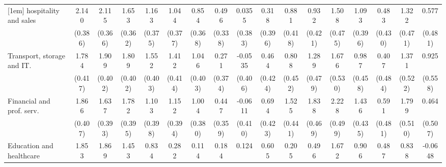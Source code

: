 {\begin{tabular}{l*{16}{c}}
[1em]
hospitality and sales&       2.140\sym{***}&       2.115\sym{***}&       1.653\sym{***}&       1.163\sym{**} &       1.044\sym{**} &       0.854\sym{*}  &       0.496         &      0.0355         &       0.318         &       0.881\sym{*}  &       0.932\sym{*}  &       1.508\sym{**} &       1.093\sym{**} &       0.483         &       1.322\sym{**} &       0.577         \\
                    &     (0.386)         &     (0.366)         &     (0.362)         &     (0.375)         &     (0.377)         &     (0.368)         &     (0.338)         &     (0.383)         &     (0.396)         &     (0.418)         &     (0.421)         &     (0.475)         &     (0.396)         &     (0.430)         &     (0.471)         &     (0.481)         \\
[1em]
Transport, storage and IT.&       1.784\sym{***}&       1.909\sym{***}&       1.809\sym{***}&       1.552\sym{***}&       1.412\sym{***}&       1.046\sym{**} &       0.271         &     -0.0535         &       0.464         &       0.808         &       1.289\sym{**} &       1.676\sym{**} &       0.987\sym{*}  &       0.407         &       1.371\sym{**} &       0.925         \\
                    &     (0.417)         &     (0.402)         &     (0.402)         &     (0.403)         &     (0.414)         &     (0.403)         &     (0.374)         &     (0.406)         &     (0.424)         &     (0.452)         &     (0.479)         &     (0.530)         &     (0.458)         &     (0.484)         &     (0.522)         &     (0.558)         \\
[1em]
Financial and prof. serv.&       1.866\sym{***}&       1.637\sym{***}&       1.782\sym{***}&       1.103\sym{**} &       1.152\sym{**} &       1.004\sym{**} &       0.447         &     -0.0611         &       0.694         &       1.525\sym{***}&       1.838\sym{***}&       2.228\sym{***}&       1.436\sym{***}&       0.591         &       1.799\sym{***}&       0.464         \\
                    &     (0.407)         &     (0.393)         &     (0.395)         &     (0.398)         &     (0.394)         &     (0.380)         &     (0.359)         &     (0.410)         &     (0.423)         &     (0.441)         &     (0.469)         &     (0.499)         &     (0.435)         &     (0.481)         &     (0.510)         &     (0.507)         \\
[1em]
Education and healthcare&       1.853\sym{***}&       1.869\sym{***}&       1.453\sym{**} &       0.834         &       0.282         &       0.114         &       0.184         &       0.124         &       0.605         &       0.205         &       0.496         &       1.672\sym{**} &       0.906         &       0.487         &       0.838         &     -0.0648         \\

\end{tabular}}
